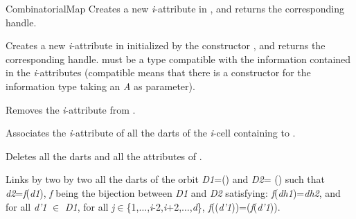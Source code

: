 \begin{ccRefConcept}{CombinatorialMap}
{Creates a new \emph{i}-attribute in , and returns the corresponding handle.
  }
	
{Creates a new \emph{i}-attribute in  initialized 
  by the constructor , and returns the corresponding handle.  must be 
  a type compatible with the information contained in the \emph{i}-attributes 
  (compatible means that there is a constructor for the information type 
  taking an \emph{A} as parameter).
  }

{Removes the \emph{i}-attribute  from .
  }

   {Associates the \emph{i}-attribute of all the darts of the \emph{i}-cell 
     containing  to .
  }

   {Deletes all the darts and all the attributes of .}
\ccOperations

 {Links by \betai{}
  two by two all the darts of the orbit
  \emph{D1}=\orbit{\betaun{},$\ldots$,\betaimdeux{},\betaipdeux{},$\ldots$,\betad{}}() and
  \emph{D2}=\orbit{\betazero{},\betadeux{},$\ldots$,\betaimdeux{},\betaipdeux{},$\ldots$,\betad{}}	()
  such that \emph{d2}=\emph{f}(\emph{d1}), \emph{f} being the bijection between \emph{D1} and \emph{D2} 
  satisfying: \emph{f}(\emph{dh1})=\emph{dh2}, and for all \emph{d'1} $\in$ \emph{D1}, for all \emph{j}$\in
  $\{1,$\ldots$,\emph{i}-2,\emph{i}+2,$\ldots$,\emph{d}\},
  \emph{f}(\betaj{}(\emph{d'1}))=\betajinv{}(\emph{f}(\emph{d'1})).

}
\end{ccRefConcept}
